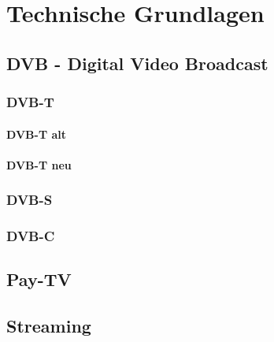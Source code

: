 \newpage
\section{Technische Grundlagen}



\subsection{DVB - Digital Video Broadcast}
\subsubsection{DVB-T}
\paragraph{DVB-T alt}
\paragraph{DVB-T neu}


\subsubsection{DVB-S}
\subsubsection{DVB-C}

\subsection{Pay-TV}

\subsection{Streaming}



